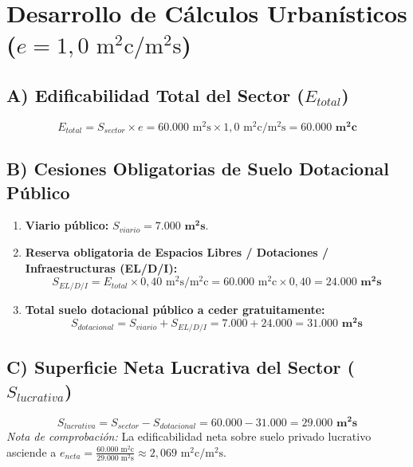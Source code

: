 \documentclass[11pt,a4paper]{article}
\begin{document}
\section{Desarrollo de Cálculos Urbanísticos \texorpdfstring{($e = 1,0\text{ m}^2\text{c}/\text{m}^2\text{s}$)}{(e = 1.0 m2c/m2s)}}

\subsection{A) Edificabilidad Total del Sector \texorpdfstring{($E_{total}$)}{(E total)}}
\[
  E_{total} = S_{sector} \times e = 60.000\text{ m}^2\text{s} \times 1,0\text{ m}^2\text{c}/\text{m}^2\text{s} = \mathbf{60.000\text{ m}^2\text{c}}
\]

\subsection{B) Cesiones Obligatorias de Suelo Dotacional Público}
\begin{enumerate}
  \item \textbf{Viario público:} $S_{viario} = \mathbf{7.000\text{ m}^2\text{s}}$.
  \item \textbf{Reserva obligatoria de Espacios Libres / Dotaciones / Infraestructuras (EL/D/I):}
  \[
    S_{EL/D/I} = E_{total} \times 0,40\text{ m}^2\text{s}/\text{m}^2\text{c} = 60.000\text{ m}^2\text{c} \times 0,40 = \mathbf{24.000\text{ m}^2\text{s}}
  \]
  \item \textbf{Total suelo dotacional público a ceder gratuitamente:}
  \[
    S_{dotacional} = S_{viario} + S_{EL/D/I} = 7.000 + 24.000 = \mathbf{31.000\text{ m}^2\text{s}}
  \]
\end{enumerate}

\subsection{C) Superficie Neta Lucrativa del Sector \texorpdfstring{($S_{lucrativa}$)}{(S lucrativa)}}
\[
  S_{lucrativa} = S_{sector} - S_{dotacional} = 60.000 - 31.000 = \mathbf{29.000\text{ m}^2\text{s}}
\]
\textit{Nota de comprobación:} La edificabilidad neta sobre suelo privado lucrativo asciende a $e_{neta} = \frac{60.000\text{ m}^2\text{c}}{29.000\text{ m}^2\text{s}} \approx 2,069\text{ m}^2\text{c}/\text{m}^2\text{s}$.
\end{document}
